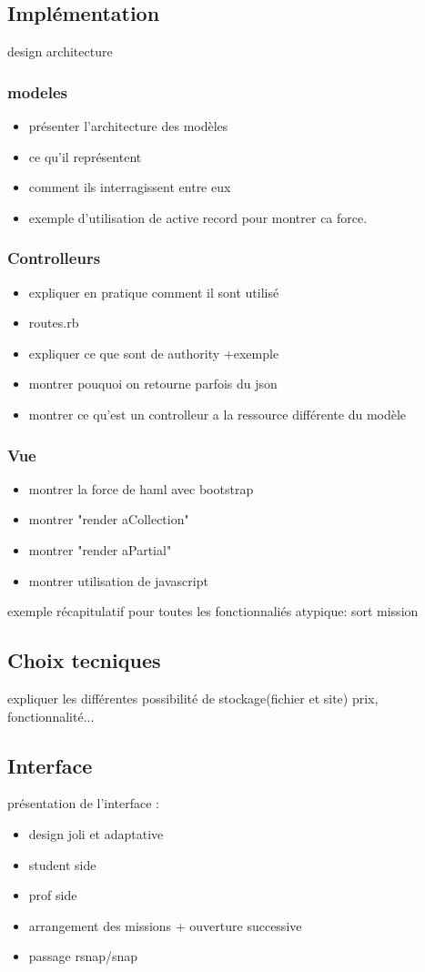 \subsection{Implémentation}
design architecture

\subsubsection{modeles}
\begin{itemize}
  \item présenter l'architecture des modèles
  \item ce qu'il représentent
  \item comment ils interragissent entre eux
  \item exemple d'utilisation de active record pour montrer ca force.
\end{itemize}

\subsubsection{Controlleurs}
\begin{itemize}
  \item expliquer en pratique comment il sont utilisé
  \item routes.rb
  \item expliquer ce que sont de authority +exemple
  \item montrer pouquoi on retourne parfois du json
  \item montrer ce qu'est un controlleur a la ressource différente du modèle
\end{itemize}

\subsubsection{Vue}
\begin{itemize}
  \item montrer la force de haml avec bootstrap
  \item montrer "render aCollection"
  \item montrer "render aPartial"
  \item montrer utilisation de javascript
\end{itemize}

exemple récapitulatif pour toutes les fonctionnaliés atypique: sort mission

\subsection{Choix tecniques}
expliquer les différentes possibilité de stockage(fichier et site) prix, fonctionnalité...

\subsection{Interface}
présentation de l'interface :
\begin{itemize}
  \item design joli et adaptative
  \item student side
  \item prof side
  \item arrangement des missions + ouverture successive
  \item passage rsnap/snap
\end{itemize}
